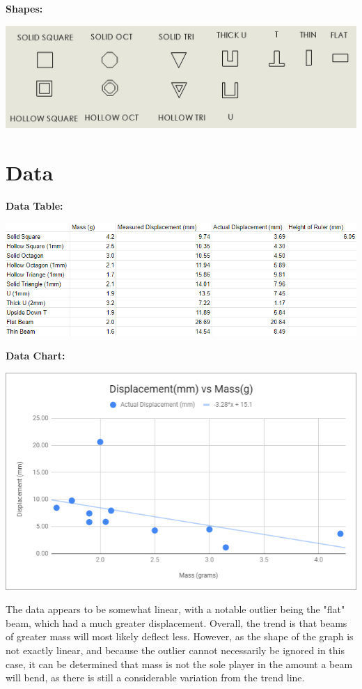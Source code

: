 \documentclass{article}
\begin{document}
\textbf{Shapes:}\newline
\begin{center}
	\includegraphics[width=.8\linewidth]{Shapes.png}
\end{center}
\pagebreak
\section*{Data}
\textbf{Data Table:}\newline
\begin{center}
	\includegraphics[width=.8\linewidth]{Table.png}
\end{center}
\textbf{Data Chart:}\newline
\begin{center}
	\includegraphics[width=.8\linewidth]{Chart.png}
\end{center}
\quad 
The data appears to be somewhat linear, with a notable outlier being the "flat" beam, which had a much greater displacement. Overall, the trend is that beams of greater mass will most likely deflect less. However, as the shape of the graph is not exactly linear, and because the outlier cannot necessarily be ignored in this case, it can be determined that mass is not the sole player in the amount a beam will bend, as there is still a considerable variation from the trend line.
\pagebreak
\end{document}
